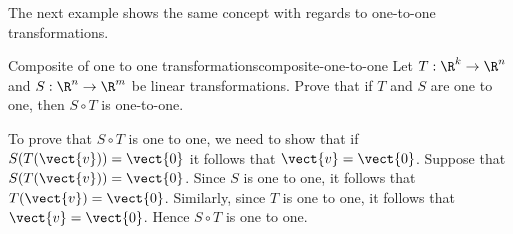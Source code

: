 The next example shows the same concept with regards to one-to-one transformations.

\begin{example}{Composite of one to one transformations}{composite-one-to-one}
Let $T: \R^k \to \R^n$ and $S: \R^n \to \R^m$ be linear transformations.
Prove that if $T$ and $S$ are one to one, then $S \circ T$
is one-to-one.
\end{example}

\begin{solution}
To prove that $S \circ T$ is one to one, we need to show that if $S(T (\vect{v})) = \vect{0}$ it follows that $\vect{v} = \vect{0}$.
Suppose that  $S(T (\vect{v})) = \vect{0}$. Since $S$ is one to one, it follows that  $T (\vect{v}) = \vect{0}$. Similarly, since $T$ is one to one, it follows that $\vect{v} = \vect{0}$. Hence $S \circ T$ is one to one.
\end{solution}
